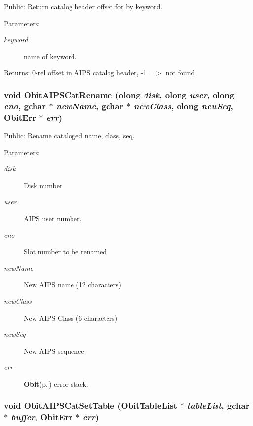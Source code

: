 Public: Return catalog header offset for by keyword. 

\begin{Desc}
\item[Parameters:]
\begin{description}
\item[{\em keyword}]name of keyword. \end{description}
\end{Desc}
\begin{Desc}
\item[Returns:]0-rel offset in AIPS catalog header, -1 =$>$ not found \end{Desc}
\subsubsection{\setlength{\rightskip}{0pt plus 5cm}void Obit\-AIPSCat\-Rename ({\bf olong} {\em disk}, {\bf olong} {\em user}, {\bf olong} {\em cno}, gchar $\ast$ {\em new\-Name}, gchar $\ast$ {\em new\-Class}, {\bf olong} {\em new\-Seq}, {\bf Obit\-Err} $\ast$ {\em err})}\label{ObitAIPSCat_8c_a16}


Public: Rename cataloged name, class, seq. 

\begin{Desc}
\item[Parameters:]
\begin{description}
\item[{\em disk}]Disk number \item[{\em user}]AIPS user number. \item[{\em cno}]Slot number to be renamed \item[{\em new\-Name}]New AIPS name (12 characters) \item[{\em new\-Class}]New AIPS Class (6 characters) \item[{\em new\-Seq}]New AIPS sequence \item[{\em err}]{\bf Obit}{\rm (p.\,\pageref{structObit})} error stack. \end{description}
\end{Desc}
\subsubsection{\setlength{\rightskip}{0pt plus 5cm}void Obit\-AIPSCat\-Set\-Table ({\bf Obit\-Table\-List} $\ast$ {\em table\-List}, gchar $\ast$ {\em buffer}, {\bf Obit\-Err} $\ast$ {\em err})}\label{ObitAIPSCat_8c_a10}


